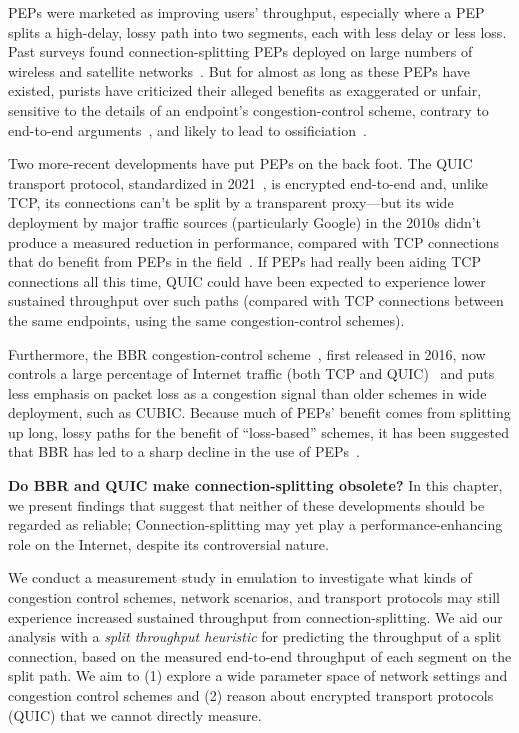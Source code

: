 PEPs were marketed as improving users' throughput, especially where a
PEP splits a high-delay, lossy path into two segments, each with less
delay or less loss. Past surveys found connection-splitting PEPs
deployed on large numbers of wireless and satellite
networks~\cite{rfc3135, honda2011still}. But for almost as long as
these PEPs have existed, purists have criticized their alleged
benefits as exaggerated or unfair, sensitive to the details of an
endpoint's congestion-control scheme, contrary to end-to-end
arguments~\cite{saltzer1984endtoend}, and likely to lead to
ossificiation~\cite{papastergiou2017deossifying, edeline2019bottomup}.

Two more-recent developments have put PEPs on the back foot. The QUIC
transport protocol, standardized in 2021~\cite{rfc9000}, is encrypted
end-to-end and, unlike TCP, its connections can't be split by a
transparent proxy---but its wide deployment by major traffic sources (particularly Google)
in the 2010s didn't produce a measured reduction in performance,
compared with TCP connections that do benefit from PEPs in the
field~\cite{langley2017quic}. If PEPs had really been aiding TCP connections all this time,
QUIC could have been expected to experience lower sustained throughput
over such paths (compared with TCP connections between the same
endpoints, using the same congestion-control schemes).

Furthermore, the BBR congestion-control scheme~\cite{cardwell2017bbr}, first
released in 2016, now controls a large percentage of Internet traffic
(both TCP and QUIC)~\cite{ware2024ccanalyzer} and puts less emphasis on packet
loss as a congestion signal than older schemes in wide
deployment, such as CUBIC. Because much of PEPs' benefit comes from
splitting up long, lossy paths for the benefit of ``loss-based''
schemes, it has been suggested that BBR has led to
a sharp decline in the use of PEPs~\cite{frode}.

\textbf{Do BBR and QUIC make connection-splitting obsolete?} In this
chapter, we present findings that suggest that neither of these
developments should be regarded as reliable;
Connection-splitting may yet play a performance-enhancing role
on the Internet, despite its controversial nature.

We conduct a measurement study in emulation to investigate what kinds of
congestion control schemes, network scenarios, and transport protocols may
still experience increased sustained throughput from connection-splitting. We
aid our analysis with a \textit{split throughput heuristic} for predicting the
throughput of a split
connection, based on the measured end-to-end throughput of each segment on the
split path. We aim to (1) explore a wide parameter space of network settings
and congestion control schemes and (2) reason about encrypted transport
protocols (QUIC) that we cannot directly measure.

